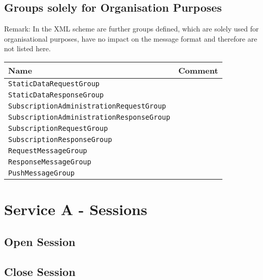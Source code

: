 \subsection*{Groups solely for Organisation Purposes}
Remark: In the XML scheme are further groups defined, which are solely used for organisational purposes, have no impact on the message format and therefore are not listed here.
\begin{samepage}
\begin{flushleft}
\begin{tabularx}{\linewidth}{l>{\raggedright\arraybackslash}X}
\toprule
Name &  Comment \label{tab:miscGroups}\\
\midrule
\texttt{StaticDataRequestGroup} & \\
\texttt{StaticDataResponseGroup}& \\
\texttt{SubscriptionAdministrationRequestGroup} & \\
\texttt{SubscriptionAdministrationResponseGroup}& \\
\texttt{SubscriptionRequestGroup} & \\
\texttt{SubscriptionResponseGroup}& \\
\texttt{RequestMessageGroup}& \\
\texttt{ResponseMessageGroup}& \\
\texttt{PushMessageGroup}& \\
\bottomrule
\end{tabularx}\end{flushleft}\end{samepage}

\section{Service A - Sessions}
\label{sec:Nachrichten:DienstA}

\subsection*{Open Session}
\label{subsec:Nachrichten:DienstA:OpenSession}





\subsection*{Close Session}
\label{subsec:Nachrichten:DienstA:CloseSession}





